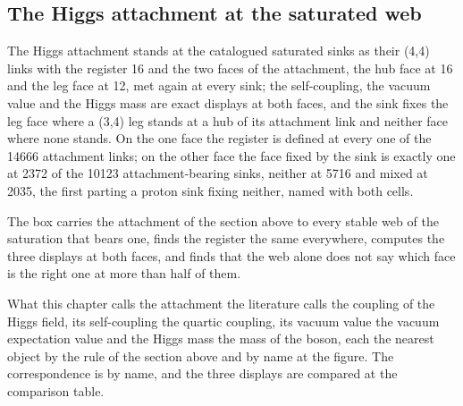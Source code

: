 \subsection{The Higgs attachment at the saturated web}\label{mod:VI-10-D536188-w-hgau}
\begin{chwall}\label{box:VI-10-D536188-w-hgau:1}
The Higgs attachment stands at the catalogued saturated sinks as their (4,4) links with the register 16 and the two faces of the attachment, the hub face at 16 and the leg face at 12, met again at every sink; the self-coupling, the vacuum value and the Higgs mass are exact displays at both faces, and the sink fixes the leg face where a (3,4) leg stands at a hub of its attachment link and neither face where none stands. On the one face the register is defined at every one of the 14666 attachment links; on the other face the face fixed by the sink is exactly one at 2372 of the 10123 attachment-bearing sinks, neither at 5716 and mixed at 2035, the first parting a proton sink fixing neither, named with both cells.
\end{chwall}
The box carries the attachment of the section above to every stable web of the saturation that bears one, finds the register the same everywhere, computes the three displays at both faces, and finds that the web alone does not say which face is the right one at more than half of them.
\begin{chbridge}
What this chapter calls the attachment the literature calls the coupling of the Higgs field, its self-coupling the quartic coupling, its vacuum value the vacuum expectation value and the Higgs mass the mass of the boson, each the nearest object by the rule of the section above and by name at the figure. The correspondence is by name, and the three displays are compared at the comparison table.
\end{chbridge}
